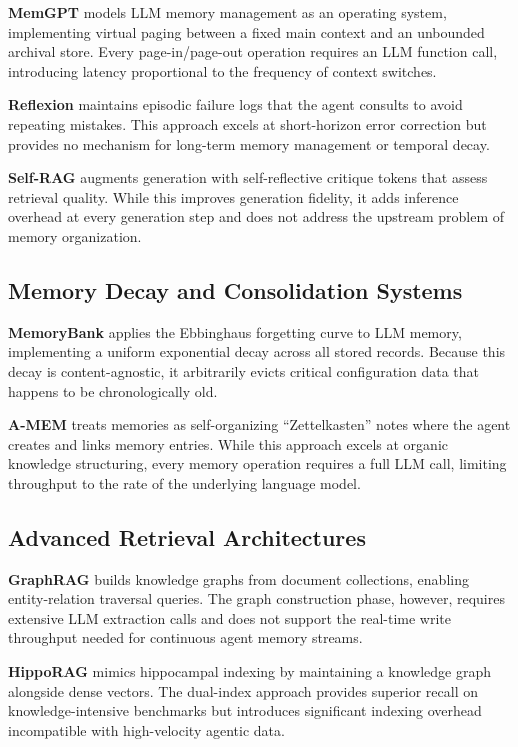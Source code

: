 \documentclass[conference]{IEEEtran}
\begin{document}
\textbf{MemGPT} \cite{packer2023memgpt} models LLM memory management as an operating system, implementing virtual paging between a fixed main context and an unbounded archival store. Every page-in/page-out operation requires an LLM function call, introducing latency proportional to the frequency of context switches.

\textbf{Reflexion} \cite{shinn2023reflexion} maintains episodic failure logs that the agent consults to avoid repeating mistakes. This approach excels at short-horizon error correction but provides no mechanism for long-term memory management or temporal decay.

\textbf{Self-RAG} \cite{asai2023selfrag} augments generation with self-reflective critique tokens that assess retrieval quality. While this improves generation fidelity, it adds inference overhead at every generation step and does not address the upstream problem of memory organization.

\subsection{Memory Decay and Consolidation Systems}
\textbf{MemoryBank} \cite{zhong2023memorybank} applies the Ebbinghaus forgetting curve to LLM memory, implementing a uniform exponential decay across all stored records. Because this decay is content-agnostic, it arbitrarily evicts critical configuration data that happens to be chronologically old.

\textbf{A-MEM} \cite{zheng2025amem} treats memories as self-organizing ``Zettelkasten'' notes where the agent creates and links memory entries. While this approach excels at organic knowledge structuring, every memory operation requires a full LLM call, limiting throughput to the rate of the underlying language model.

\subsection{Advanced Retrieval Architectures}
\textbf{GraphRAG} \cite{edge2024graphrag} builds knowledge graphs from document collections, enabling entity-relation traversal queries. The graph construction phase, however, requires extensive LLM extraction calls and does not support the real-time write throughput needed for continuous agent memory streams.

\textbf{HippoRAG} \cite{guan2024hipporag} mimics hippocampal indexing by maintaining a knowledge graph alongside dense vectors. The dual-index approach provides superior recall on knowledge-intensive benchmarks but introduces significant indexing overhead incompatible with high-velocity agentic data.
\end{document}
